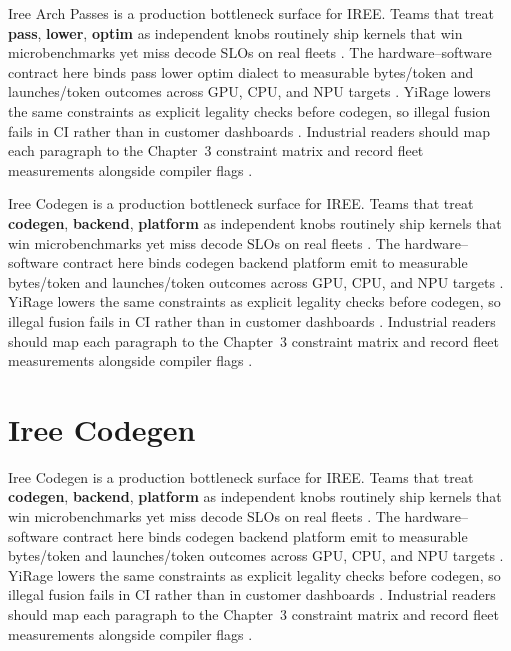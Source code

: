 Iree Arch Passes is a production bottleneck surface for IREE. Teams that treat \textbf{pass}, \textbf{lower}, \textbf{optim} as independent knobs routinely ship kernels that win microbenchmarks yet miss decode SLOs on real fleets \citep{patel2025llminference,nvidia2022hopper}. The hardware--software contract here binds pass lower optim dialect to measurable bytes/token and launches/token outcomes across GPU, CPU, and NPU targets \citep{taxbreak2026,semianalysis2024tma}. YiRage lowers the same constraints as explicit legality checks before codegen, so illegal fusion fails in CI rather than in customer dashboards \citep{memoryfloor2026,amd2024xdna}. Industrial readers should map each paragraph to the Chapter~3 constraint matrix and record fleet measurements alongside compiler flags \citep{nvidia2022hopper,amd2024aie}.

Iree Codegen is a production bottleneck surface for IREE. Teams that treat \textbf{codegen}, \textbf{backend}, \textbf{platform} as independent knobs routinely ship kernels that win microbenchmarks yet miss decode SLOs on real fleets \citep{taxbreak2026,semianalysis2024tma}. The hardware--software contract here binds codegen backend platform emit to measurable bytes/token and launches/token outcomes across GPU, CPU, and NPU targets \citep{memoryfloor2026,amd2024xdna}. YiRage lowers the same constraints as explicit legality checks before codegen, so illegal fusion fails in CI rather than in customer dashboards \citep{nvidia2022hopper,amd2024aie}. Industrial readers should map each paragraph to the Chapter~3 constraint matrix and record fleet measurements alongside compiler flags \citep{semianalysis2024tma,dlbook}.

\section{Iree Codegen}
\label{sec:iree_codegen}

Iree Codegen is a production bottleneck surface for IREE. Teams that treat \textbf{codegen}, \textbf{backend}, \textbf{platform} as independent knobs routinely ship kernels that win microbenchmarks yet miss decode SLOs on real fleets \citep{memoryfloor2026,amd2024xdna}. The hardware--software contract here binds codegen backend platform emit to measurable bytes/token and launches/token outcomes across GPU, CPU, and NPU targets \citep{nvidia2022hopper,amd2024aie}. YiRage lowers the same constraints as explicit legality checks before codegen, so illegal fusion fails in CI rather than in customer dashboards \citep{semianalysis2024tma,dlbook}. Industrial readers should map each paragraph to the Chapter~3 constraint matrix and record fleet measurements alongside compiler flags \citep{amd2024xdna,dao2022flashattention}.

